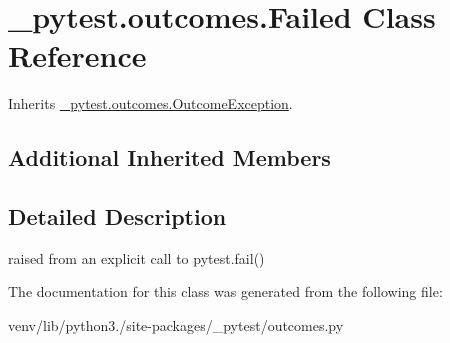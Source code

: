 \hypertarget{class__pytest_1_1outcomes_1_1_failed}{}\section{\+\_\+pytest.\+outcomes.\+Failed Class Reference}
\label{class__pytest_1_1outcomes_1_1_failed}


Inherits \hyperlink{class__pytest_1_1outcomes_1_1_outcome_exception}{\+\_\+pytest.\+outcomes.\+Outcome\+Exception}.

\subsection*{Additional Inherited Members}


\subsection{Detailed Description}
\begin{DoxyVerb}raised from an explicit call to pytest.fail() \end{DoxyVerb}
 

The documentation for this class was generated from the following file\+:\begin{DoxyCompactItemize}
\item 
venv/lib/python3./site-\/packages/\+\_\+pytest/outcomes.\+py\end{DoxyCompactItemize}
